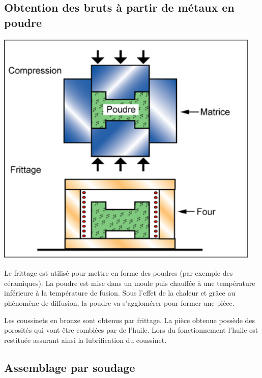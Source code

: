 \documentclass[11pt,oneside]{article}
\begin{document}
\subsection{Obtention des bruts à partir de métaux en poudre}
\begin{minipage}[c]{.35\linewidth}
\begin{center}
\includegraphics[width=0.95\textwidth]{png/frittage}
\end{center}
\end{minipage} \hfill
\begin{minipage}[c]{.55\linewidth}
Le frittage est utilisé pour mettre en forme des poudres (par exemple des céramiques). La poudre est mise dans un moule puis chauffée à une température inférieure à la température de fusion. Sous l'effet de la chaleur et grâce au phénomène de diffusion, la poudre va s'agglomérer pour former une pièce.

\begin{exemple}
Les coussinets en bronze sont obtenus par frittage. La pièce obtenue possède des porosités qui vont être comblées par de l'huile. Lors du fonctionnement l'huile est restituée assurant ainsi la lubrification du coussinet.
\end{exemple}
\end{minipage}

\subsection{Assemblage par soudage}
\end{document}
